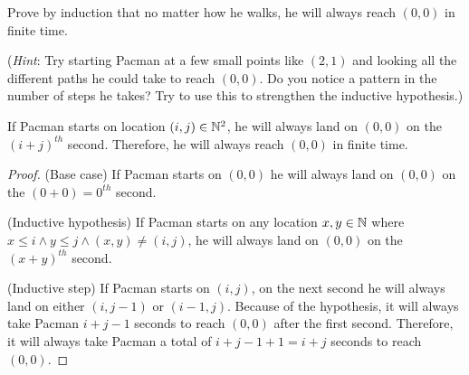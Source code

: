 \documentclass[11pt]{article}
\begin{document}
Prove by induction that no matter how he walks, he will always reach $(0, 0)$ in finite time.

(\textit{Hint}: Try starting Pacman at a few small points like $(2, 1)$ and looking all the different paths he could take to reach $(0, 0)$.  Do you notice a pattern in the number of steps he takes? Try to use this to strengthen the inductive hypothesis.)

\begin{solution}
If Pacman starts on location $(i,j)\in\mathbb{N}^{2}$, he will always
land on $(0,0)$ on the $(i+j)^{th}$ second. 
Therefore, he will always reach $(0,0)$ in finite time.
\begin{proof}
(Base case) If Pacman starts on $(0,0)$ he will always land on $(0,0)$ on the $(0+0)=0^{th}$ second.

(Inductive hypothesis) If Pacman starts on any location $x,y\in\mathbb{N}$ where 
$x\leq i\land y\leq j\land(x,y)\neq(i,j)$,
he will always
land on $(0,0)$ on the $(x+y)^{th}$ second. 

(Inductive step) If Pacman starts on $(i,j)$, 
on the next second he will always land on either $(i,j-1)$ or $(i-1,j)$.
Because of the hypothesis, it will always take Pacman $i+j-1$ seconds to reach $(0,0)$ after the first second.
Therefore, it will always take Pacman a total of $i+j-1+1=i+j$ seconds to reach $(0,0)$.
\end{proof}
\end{solution} \newpage

\end{document}

